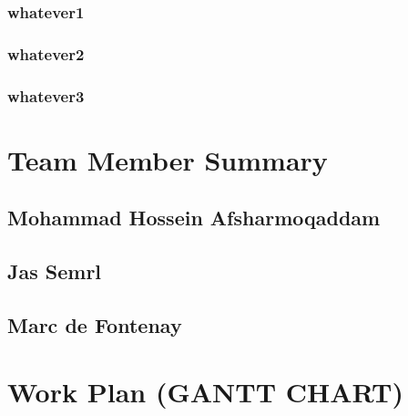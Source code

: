 \documentclass[12pt]{article}
\begin{document}
\par


\subsubsection{whatever1}


\subsubsection{whatever2}


\subsubsection{whatever3}



\newpage
\section{Team Member Summary}

\subsection{Mohammad Hossein Afsharmoqaddam}


\subsection{Jas Semrl}


\subsection{Marc de Fontenay}





\newpage
\section{Work Plan (GANTT CHART)}

\par


\newpage
\end{document}
